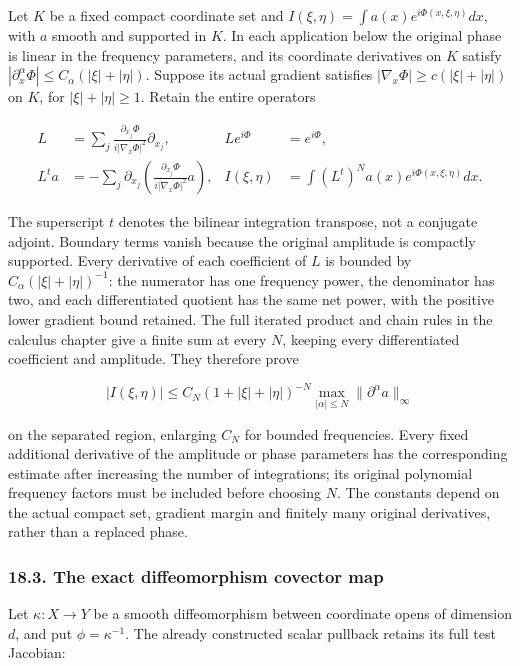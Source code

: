 \documentclass[
  11pt,
]{article}
\begin{document}
Let \(K\) be a fixed compact coordinate set and
\(I(\xi,\eta)=\int a(x)e^{i\Phi(x,\xi,\eta)}dx\), with \(a\) smooth and
supported in \(K\). In each application below the original phase is
linear in the frequency parameters, and its coordinate derivatives on
\(K\) satisfy \(|\partial_x^\alpha\Phi|\leq C_\alpha(|\xi|+|\eta|)\).
Suppose its actual gradient satisfies
\(|\nabla_x\Phi|\geq c(|\xi|+|\eta|)\) on \(K\), for
\(|\xi|+|\eta|\geq1\). Retain the entire operators

\[
\begin{aligned}
L&=\sum_j\frac{\partial_{x_j}\Phi}{i|\nabla_x\Phi|^2}\partial_{x_j},
&Le^{i\Phi}&=e^{i\Phi},\\
L^ta&=-\sum_j\partial_{x_j}
       \left(\frac{\partial_{x_j}\Phi}{i|\nabla_x\Phi|^2}a\right),
&I(\xi,\eta)&=\int (L^t)^Na(x)e^{i\Phi(x,\xi,\eta)}dx .
\end{aligned}
\tag{WF3}
\]

The superscript \(t\) denotes the bilinear integration transpose, not a
conjugate adjoint. Boundary terms vanish because the original amplitude
is compactly supported. Every derivative of each coefficient of \(L\) is
bounded by \(C_\alpha(|\xi|+|\eta|)^{-1}\): the numerator has one
frequency power, the denominator has two, and each differentiated
quotient has the same net power, with the positive lower gradient bound
retained. The full iterated product and chain rules in the calculus
chapter give a finite sum at every \(N\), keeping every differentiated
coefficient and amplitude. They therefore prove

\[
|I(\xi,\eta)|\leq C_N(1+|\xi|+|\eta|)^{-N}
                \max_{|\alpha|\leq N}\|\partial^\alpha a\|_\infty
\tag{WF4}
\]

on the separated region, enlarging \(C_N\) for bounded frequencies.
Every fixed additional derivative of the amplitude or phase parameters
has the corresponding estimate after increasing the number of
integrations; its original polynomial frequency factors must be included
before choosing \(N\). The constants depend on the actual compact set,
gradient margin and finitely many original derivatives, rather than a
replaced phase.

\subsubsection{18.3. The exact diffeomorphism covector
map}\label{the-exact-diffeomorphism-covector-map}

Let \(\kappa:X\to Y\) be a smooth diffeomorphism between coordinate
opens of dimension \(d\), and put \(\phi=\kappa^{-1}\). The already
constructed scalar pullback retains its full test Jacobian:
\end{document}
